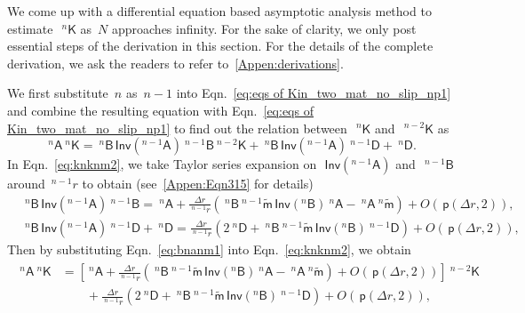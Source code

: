 \documentclass[preprint,10pt,times]{elsarticle}
\numberwithin{equation}{section}
\renewcommand{\u}[1]{\boldsymbol{#1}}
\newcommand{\usf}[1]{\u{\mathsf #1}}
\newcommand{\pr}[1]{\left( #1 \right)}
\newcommand{\p}{\,\mathsf{p}}
\newcommand{\Inv}{\,\mathsf{Inv}}
\renewcommand{\>}{$\Rightarrow$}
\begin{document}
We come up with a differential equation based asymptotic analysis method to estimate~$~^{n}{\usf{K}}$ as~$N$ approaches infinity. For the sake of clarity, we only post essential steps of the derivation in this section. For the details of the complete derivation, we ask the readers to refer to~\ref{Appen:derivations}.

We first substitute~$n$ as~$n-1$ into Eqn.~\eqref{eq:eqs of Kin_two_mat_no_slip_np1} and combine the resulting equation with Eqn.~\eqref{eq:eqs of Kin_two_mat_no_slip_np1} to find out the relation between~$~^{n}{\usf{K}}$ and~$~^{{n-2}}{\usf{K}}$ as
\begin{equation}
	~^{n}{\usf{A}} ~^{n}{\usf{K}}  = ~^{n}{\usf{B}} \Inv\pr{{}^{{n-1}}\usf{A}} ~^{{n-1}}{\usf{B}} ~^{{n-2}}{\usf{K}} + ~^{n}{\usf{B}} \Inv\pr{{}^{{n-1}}\usf{A}} ~^{{n-1}}{\usf{D}}  + ~^{n}{\usf{D}} .
	\label{eq:knknm2}
\end{equation}
In Eqn.~\eqref{eq:knknm2}, we take Taylor series expansion on~$\Inv\pr{{}^{{n-1}}\usf{A}}$ and~$~^{{n-1}}{\usf{B}}$ around~${}^{n-1}\!{r}$ to obtain (see~\ref{Appen:Eqn315} for details)
\begin{subequations}
	\begin{align}
	& ~^{n}{\usf{B}} \Inv\pr{{}^{{n-1}}\usf{A}} ~^{{n-1}}{\usf{B}} = ~^{n}{\usf{A}} + \frac{\Delta r}{~^{n-1}\!{r}} \left( ~^{n}{\usf{B}} ~^{n-1}\tilde{\usf{m}} \Inv\pr{{}^{n}\usf{B}} ~^{n}{\usf{A}} - ~^{n}{\usf{A}} ~^{n}\tilde{\usf{m}} \right)  + O(\p\pr{\Delta r,2}), \\
	& ~^{n}{\usf{B}} \Inv\pr{{}^{{n-1}}\usf{A}} ~^{{n-1}}{\usf{D}} + ~^{n}{\usf{D}} = \frac{\Delta r}{~^{n-1}\!{r}} \left( 2~^{n}{\usf{D}} + ~^{n}{\usf{B}} ~^{n-1}\tilde{\usf{m}} \Inv\pr{{}^{n}\usf{B}} ~^{{n-1}}{\usf{D}} \right) + O(\p\pr{\Delta r,2}),
	\end{align}
	\label{eq:bnanm1}
\end{subequations}
Then by substituting Eqn.~\eqref{eq:bnanm1} into Eqn.~\eqref{eq:knknm2}, we obtain
\begin{equation}
\begin{aligned}
	\begin{split}
	~^{n}{\usf{A}} ~^{n}{\usf{K}} & = \left[  ~^{n}{\usf{A}} + \frac{\Delta r}{~^{n-1}\!{r}} \left( ~^{n}{\usf{B}} ~^{n-1}\tilde{\usf{m}} \Inv\pr{{}^{n}\usf{B}} ~^{n}{\usf{A}} - ~^{n}{\usf{A}} ~^{n}\tilde{\usf{m}} \right)  + O(\p\pr{\Delta r,2}) \right] ~^{{n-2}}{\usf{K}} \\
	& \qquad + \frac{\Delta r}{~^{n-1}\!{r}} \left( 2~^{n}{\usf{D}} + ~^{n}{\usf{B}} ~^{n-1}\tilde{\usf{m}} \Inv\pr{{}^{n}\usf{B}} ~^{{n-1}}{\usf{D}} \right) + O(\p\pr{\Delta r,2}),
	\end{split}
\end{aligned}
\label{eq:knknm2appr1}
\end{equation}
\end{document}
